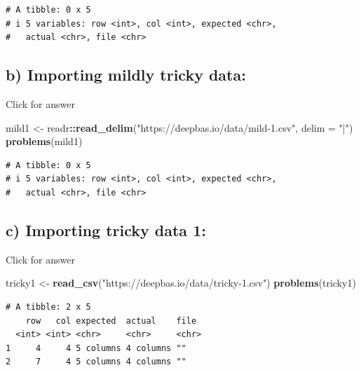 \documentclass[
]{book}
\newenvironment{Shaded}{\begin{snugshade}}{\end{snugshade}}
\newcommand{\AttributeTok}[1]{\textcolor[rgb]{0.13,0.29,0.53}{#1}}
\newcommand{\FunctionTok}[1]{\textcolor[rgb]{0.13,0.29,0.53}{\textbf{#1}}}
\newcommand{\NormalTok}[1]{#1}
\newcommand{\OtherTok}[1]{\textcolor[rgb]{0.56,0.35,0.01}{#1}}
\newcommand{\SpecialCharTok}[1]{\textcolor[rgb]{0.81,0.36,0.00}{\textbf{#1}}}
\newcommand{\StringTok}[1]{\textcolor[rgb]{0.31,0.60,0.02}{#1}}
\begin{document}
\begin{verbatim}
# A tibble: 0 x 5
# i 5 variables: row <int>, col <int>, expected <chr>,
#   actual <chr>, file <chr>
\end{verbatim}

\hypertarget{b-importing-mildly-tricky-data}{%
\subsection{b) Importing mildly tricky data:}\label{b-importing-mildly-tricky-data}}

Click for answer

\begin{Shaded}
\begin{Highlighting}[]
\NormalTok{mild1 }\OtherTok{\textless{}{-}}\NormalTok{ readr}\SpecialCharTok{::}\FunctionTok{read\_delim}\NormalTok{(}\StringTok{"https://deepbas.io/data/mild{-}1.csv"}\NormalTok{, }\AttributeTok{delim =} \StringTok{"|"}\NormalTok{)}
\FunctionTok{problems}\NormalTok{(mild1)}
\end{Highlighting}
\end{Shaded}

\begin{verbatim}
# A tibble: 0 x 5
# i 5 variables: row <int>, col <int>, expected <chr>,
#   actual <chr>, file <chr>
\end{verbatim}

\hypertarget{c-importing-tricky-data-1}{%
\subsection{c) Importing tricky data 1:}\label{c-importing-tricky-data-1}}

Click for answer

\begin{Shaded}
\begin{Highlighting}[]
\NormalTok{tricky1 }\OtherTok{\textless{}{-}}  \FunctionTok{read\_csv}\NormalTok{(}\StringTok{"https://deepbas.io/data/tricky{-}1.csv"}\NormalTok{)}
\FunctionTok{problems}\NormalTok{(tricky1)}
\end{Highlighting}
\end{Shaded}

\begin{verbatim}
# A tibble: 2 x 5
    row   col expected  actual    file 
  <int> <int> <chr>     <chr>     <chr>
1     4     4 5 columns 4 columns ""   
2     7     4 5 columns 4 columns ""   
\end{verbatim}
\end{document}
